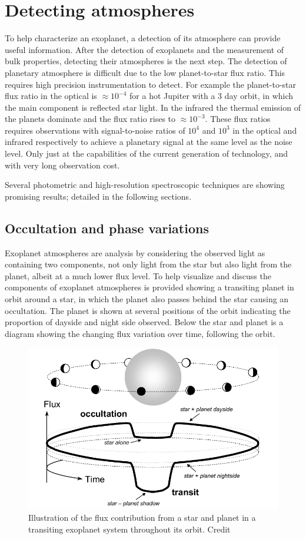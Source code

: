 
\section{Detecting atmospheres}
To help characterize an exoplanet, a detection of its atmosphere can provide useful information. After the detection of exoplanets and the measurement of bulk properties, detecting their atmospheres is the next step. The detection of planetary atmosphere is difficult due to the low planet-to-star flux ratio. This requires high precision instrumentation to detect. For example the planet-to-star flux ratio in the optical is $\approx 10^{-4}$ for a hot Jupiter with a 3 day orbit, in which the main component is reflected star light. In the infrared the thermal emission of the planets dominate and the flux ratio rises to $\approx 10^{-3}$. These flux ratios requires observations with signal-to-noise ratios of $10^4$ and $10^3$ in the optical and infrared respectively to achieve a planetary signal at the same level as the noise level. Only just at the capabilities of the current generation of technology, and with very long observation cost.


Several photometric and high-resolution spectroscopic techniques are showing promising results; detailed in the following sections.


\subsection{Occultation and phase variations}
Exoplanet atmospheres are analysis by considering the observed light as containing two components, not only light from the star but also light from the planet, albeit at a much lower flux level.
To help visualize and discuss the components of exoplanet atmospheres  is provided showing a transiting planet in orbit around a star, in which the planet also passes behind the star causing an occultation. The planet is shown at several positions of the orbit indicating the proportion of dayside and night side observed.  Below the star and planet is a diagram showing the changing flux variation over time, following the orbit. 

\begin{figure}
    \centering
    \includegraphics[width=0.6\linewidth]{./figures/introduction/circular_diagram.png}
    \caption{Illustration of the flux contribution from a star and planet in a transiting exoplanet system throughout its orbit. Credit~\citet{winn_transits_2010}}
    \label{fig:transits_and_occultations}
\end{figure}


